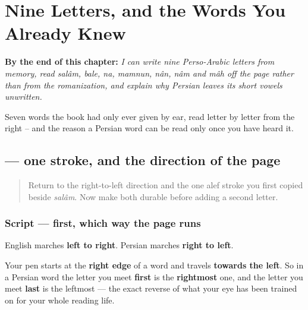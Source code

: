 
\chapter{Nine Letters, and the Words You Already Knew}
\label{ch:fa-script-nine}

\begin{chapteropening}
\textbf{By the end of this chapter:} \emph{I can write nine Perso-Arabic letters from memory, read salâm, bale, na, mamnun, nân, nâm and mâh off the page rather than from the romanization, and explain why Persian leaves its short vowels unwritten.}

Seven words the book had only ever given by ear, read letter by letter from the right -- and the reason a Persian word can be read only once you have heard it.
\end{chapteropening}

\section[\texorpdfstring{\fa{ا} (alef)}{ا (alef)}]{ — one stroke, and the direction of the page}

\label{lesson:FA-W15-alef}



\begin{quote}
Return to the right-to-left direction and the one alef stroke you first copied beside \emph{salâm}. Now make both durable before adding a second letter.
\end{quote}

\subsection*{Script — first, which way the page runs}

English marches \textbf{left to right}. Persian marches \textbf{right to left}.

Your pen starts at the \textbf{right edge} of a word and travels \textbf{towards the left}. So in a Persian word the letter you meet \textbf{first} is the \textbf{rightmost} one, and the letter you meet \textbf{last} is the leftmost — the exact reverse of what your eye has been trained on for your whole reading life.

